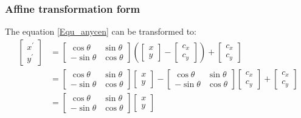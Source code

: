 \subsubsection{Affine transformation form}
The equation \ref{Equ_anycen} can be transformed to:
\begin{equation*}
  \begin{split}
  \begin{bmatrix}
   x^{'} \\ y^{'}
   \end{bmatrix} &= \begin{bmatrix} \cos\theta & \sin\theta \\ -\sin\theta & \cos\theta \end{bmatrix} \left(\begin{bmatrix} x \\ y \end{bmatrix} - \begin{bmatrix} c_{x} \\ c_{y} \end{bmatrix}\right) + \begin{bmatrix} c_{x} \\ c_{y} \end{bmatrix} \\
                 &= \begin{bmatrix}
          \cos\theta & \sin\theta \\
          -\sin\theta & \cos\theta
        \end{bmatrix}
        \begin{bmatrix}
          x \\ y
         \end{bmatrix} - \begin{bmatrix}
            \cos\theta & \sin\theta \\
            -\sin\theta & \cos\theta
          \end{bmatrix}\begin{bmatrix}
            c_{x} \\ c_{y}
          \end{bmatrix} + \begin{bmatrix}
            c_{x} \\ c_{y}
          \end{bmatrix} \\
          &= \begin{bmatrix} \cos\theta & \sin\theta \\ -\sin\theta & \cos\theta \end{bmatrix} \begin{bmatrix} x \\ y \end{bmatrix}

\end{split}
\end{equation*}
